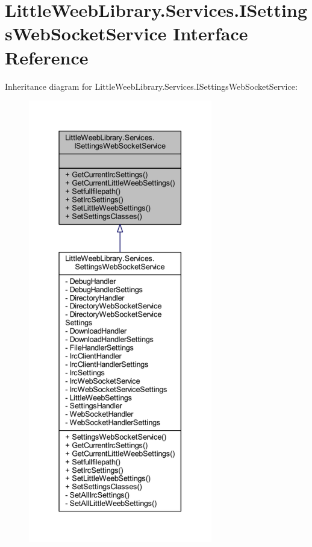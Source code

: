 \hypertarget{interface_little_weeb_library_1_1_services_1_1_i_settings_web_socket_service}{}\section{Little\+Weeb\+Library.\+Services.\+I\+Settings\+Web\+Socket\+Service Interface Reference}
\label{interface_little_weeb_library_1_1_services_1_1_i_settings_web_socket_service}


Inheritance diagram for Little\+Weeb\+Library.\+Services.\+I\+Settings\+Web\+Socket\+Service\+:\nopagebreak
\begin{figure}[H]
\begin{center}
\leavevmode
\includegraphics[height=550pt]{interface_little_weeb_library_1_1_services_1_1_i_settings_web_socket_service__inherit__graph}
\end{center}
\end{figure}


